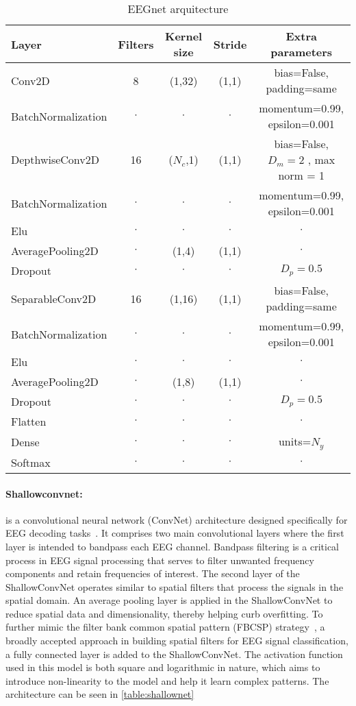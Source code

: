 \begin{table}[h!]
\caption{EEGnet arquitecture}\label{table:eegnet}
\centering
\begin{tabular}{l|c|c|c|c}
\hline
\textbf{Layer} & \textbf{Filters} & \textbf{Kernel size} & \textbf{Stride} & \textbf{Extra parameters}\\
\hline
Conv2D & 8 & (1,32) & (1,1) & bias=False, padding=same\\ 
BatchNormalization & $\cdot$ & $\cdot$ & $\cdot$ & momentum=0.99, epsilon=0.001\\ 
\hline
DepthwiseConv2D & 16 & ($N_c$,1) & (1,1) & bias=False, $D_m= 2$ , max norm = 1  \\ 
BatchNormalization & $\cdot$ & $\cdot$ & $\cdot$ & momentum=0.99, epsilon=0.001\\ 
Elu & $\cdot$ & $\cdot$ & $\cdot$ & $\cdot$\\ 
AveragePooling2D & $\cdot$ & (1,4) & (1,1) & $\cdot$ \\ 
Dropout & $\cdot$ & $\cdot$ & $\cdot$ & $D_p = 0.5$\\
\hline
SeparableConv2D & 16 & (1,16) & (1,1) & bias=False, padding=same\\
BatchNormalization & $\cdot$ & $\cdot$ & $\cdot$ & momentum=0.99, epsilon=0.001\\
Elu & $\cdot$ & $\cdot$ & $\cdot$& $\cdot$\\
AveragePooling2D & $\cdot$ &(1,8) & (1,1)& $\cdot$\\
Dropout & $\cdot$ & $\cdot$ & $\cdot$ & $D_p = 0.5$\\
\hline
Flatten & $\cdot$ & $\cdot$ & $\cdot$ & $\cdot$\\
Dense & $\cdot$ & $\cdot$ & $\cdot$ & units=$N_y$\\
Softmax & $\cdot$ & $\cdot$ & $\cdot$ & $\cdot$\\
\hline
\end{tabular}
\end{table}

\paragraph{Shallowconvnet:} is a convolutional neural network (ConvNet) architecture designed specifically for EEG decoding tasks~\cite{schirrmeister2017deep}. It comprises two main convolutional layers where the first layer is intended to bandpass each EEG channel. Bandpass filtering is a critical process in EEG signal processing that serves to filter unwanted frequency components and retain frequencies of interest. The second layer of the ShallowConvNet operates similar to spatial filters that process the signals in the spatial domain. An average pooling layer is applied in the ShallowConvNet to reduce spatial data and dimensionality, thereby helping curb overfitting. To further mimic the filter bank common spatial pattern (FBCSP) strategy~\cite{ang2008filter}, a broadly accepted approach in building spatial filters for EEG signal classification, a fully connected layer is added to the ShallowConvNet. The activation function used in this model is both square and logarithmic in nature, which aims to introduce non-linearity to the model and help it learn complex patterns. The architecture can be seen in \cref{table:shallownet}

